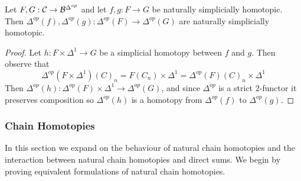 \begin{lem}[label=lem:Precomp]
    Let $F,G: \mathcal{C}\rightarrow \mathcal{B}^{\Delta^{op}}$ and let $f,g:F\to G$ be naturally simplicially homotopic. Then $\Delta^{op}(f),\Delta^{op}(g):\Delta^{op}(F)\to\Delta^{op}(G)$ are naturally simplicially homotopic.
\end{lem}
\begin{proof}
    Let $h:F\times \Delta^1\to G$ be a simplicial homotopy between $f$ and $g$. Then observe that 
    \begin{equation*}
        \Delta^{op}(F\times \Delta^1)(C)_n = F(C_n)\times \Delta^1 = \Delta^{op}(F)(C)_n\times \Delta^1
    \end{equation*}
    Then $\Delta^{op}(h):\Delta^{op}(F)\times \Delta^1\to \Delta^{op}(G)$, and since $\Delta^{op}$ is a strict 2-functor it preserves composition so $\Delta^{op}(h)$ is a homotopy from $\Delta^{op}(f)$ to $\Delta^{op}(g)$.
\end{proof}




\subsubsection{Chain Homotopies}\label{subsec:chainHomotop}


In this section we expand on the behaviour of natural chain homotopies and the interaction between natural chain homotopies and direct sums. We begin by proving equivalent formulations of natural chain homotopies.

